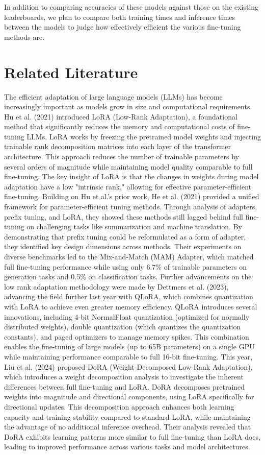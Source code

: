 \documentclass[11pt]{article}
\begin{document}
In addition to comparing accuracies of these models against those on the existing leaderboards, we plan to compare both training times and inference times between the models to judge how effectively efficient the various fine-tuning methods are.


\section{Related Literature}

The efficient adaptation of large language models (LLMs) has become increasingly important as models grow in size and computational requirements. Hu et al. (2021) introduced LoRA (Low-Rank Adaptation), a foundational method that significantly reduces the memory and computational costs of fine-tuning LLMs. LoRA works by freezing the pretrained model weights and injecting trainable rank decomposition matrices into each layer of the transformer architecture. This approach reduces the number of trainable parameters by several orders of magnitude while maintaining model quality comparable to full fine-tuning. The key insight of LoRA is that the changes in weights during model adaptation have a low "intrinsic rank," allowing for effective parameter-efficient fine-tuning.
Building on Hu et al.’s prior work, He et al. (2021) provided a unified framework for parameter-efficient tuning methods. Through analysis of adapters, prefix tuning, and LoRA, they showed these methods still lagged behind full fine-tuning on challenging tasks like summarization and machine translation. By demonstrating that prefix tuning could be reformulated as a form of adapter, they identified key design dimensions across methods. Their experiments on diverse benchmarks led to the Mix-and-Match (MAM) Adapter, which matched full fine-tuning performance while using only 6.7\% of trainable parameters on generation tasks and 0.5\% on classification tasks.
Further advancements on the low rank adaptation methodology were made by Dettmers et al. (2023), advancing the field further last year with QLoRA, which combines quantization with LoRA to achieve even greater memory efficiency. QLoRA introduces several innovations, including 4-bit NormalFloat quantization (optimized for normally distributed weights), double quantization (which quantizes the quantization constants), and paged optimizers to manage memory spikes. This combination enables the fine-tuning of large models (up to 65B parameters) on a single GPU while maintaining performance comparable to full 16-bit fine-tuning. 
This year, Liu et al. (2024) proposed DoRA (Weight-Decomposed Low-Rank Adaptation), which introduces a weight decomposition analysis to investigate the inherent differences between full fine-tuning and LoRA. DoRA decomposes pretrained weights into magnitude and directional components, using LoRA specifically for directional updates. This decomposition approach enhances both learning capacity and training stability compared to standard LoRA, while maintaining the advantage of no additional inference overhead. Their analysis revealed that DoRA exhibits learning patterns more similar to full fine-tuning than LoRA does, leading to improved performance across various tasks and model architectures.
\end{document}
